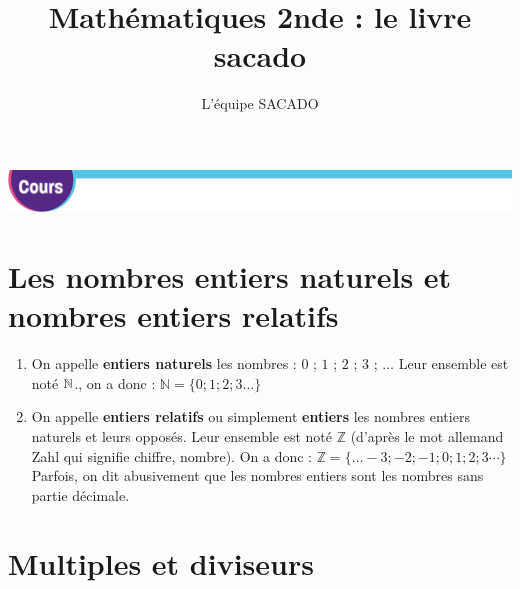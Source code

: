 



\title{Mathématiques 2nde  : le livre sacado}
\author{L'équipe SACADO}

\setlength{\parindent}{0cm}






\includegraphics[scale=0.5]{../MISC/pageCours.png} 

\begin{minipage}{0.7\linewidth}\end{minipage}
\begin{minipage}{0.3\linewidth}\end{minipage}

\section{Les nombres entiers naturels et nombres entiers relatifs}
 
\begin{DefT}{} 

\begin{enumerate}
\item On appelle \textbf{entiers naturels} les nombres : $0$ ; $1$ ; $2$ ; $3$ ; $\ldots$  Leur ensemble est noté $\mathbb N$., on a donc : $\mathbb N=  \lbrace 0 ; 1 ; 2 ; 3 \ldots \rbrace $
 
\item  On appelle \textbf{entiers relatifs} ou simplement \textbf{entiers} les nombres entiers naturels et leurs opposés. Leur ensemble est noté $\mathbb Z$ (d'après le mot allemand Zahl qui signifie chiffre, nombre).
On a donc : $\mathbb Z = \lbrace \ldots -3 ; -2 ; -1 ; 0 ; 1 ; 2 ; 3  \cdots  \rbrace$
Parfois, on dit abusivement que les nombres entiers sont les nombres sans partie décimale.
\end{enumerate}
\end{DefT}

\section{ Multiples et diviseurs }
 

